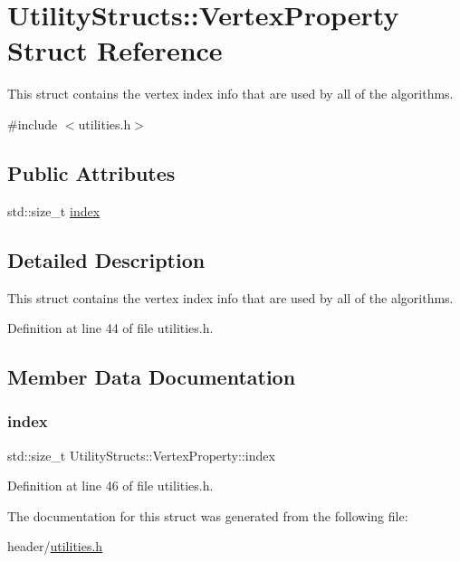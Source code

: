 \hypertarget{struct_utility_structs_1_1_vertex_property}{}\section{Utility\+Structs\+:\+:Vertex\+Property Struct Reference}
\label{struct_utility_structs_1_1_vertex_property}


This struct contains the vertex index info that are used by all of the algorithms.  




{\ttfamily \#include $<$utilities.\+h$>$}

\subsection*{Public Attributes}
\begin{DoxyCompactItemize}
\item 
std\+::size\+\_\+t \hyperlink{struct_utility_structs_1_1_vertex_property_a636cb729438e999aa3d9a17ac39d8641}{index}
\end{DoxyCompactItemize}


\subsection{Detailed Description}
This struct contains the vertex index info that are used by all of the algorithms. 

Definition at line 44 of file utilities.\+h.



\subsection{Member Data Documentation}
\mbox{\label{struct_utility_structs_1_1_vertex_property_a636cb729438e999aa3d9a17ac39d8641}} 
\subsubsection{\texorpdfstring{index}{index}}
{\footnotesize\ttfamily std\+::size\+\_\+t Utility\+Structs\+::\+Vertex\+Property\+::index}



Definition at line 46 of file utilities.\+h.



The documentation for this struct was generated from the following file\+:\begin{DoxyCompactItemize}
\item 
header/\hyperlink{utilities_8h}{utilities.\+h}\end{DoxyCompactItemize}
